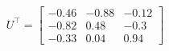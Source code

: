 \documentclass[preview]{standalone}
\begin{document}
\begin{align*}
U^\top=\left[\begin{matrix}-0.46&-0.88&-0.12\\-0.82&0.48&-0.3\\-0.33&0.04&0.94\end{matrix}\right]
\end{align*}
\end{document}
